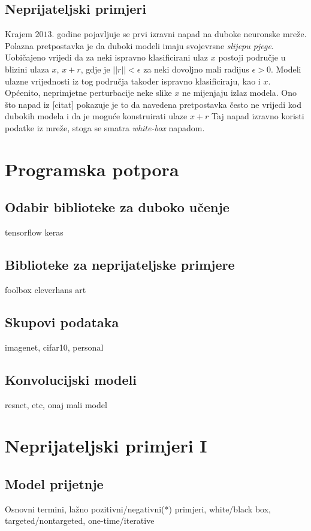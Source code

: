 \documentclass[utf8, diplomski]{fer}
\begin{document}
\section{Neprijateljski primjeri}
Krajem $2013.$ godine pojavljuje se prvi izravni napad na duboke neuronske mreže. Polazna pretpostavka je da duboki modeli imaju svojevrsne \textit{slijepu pjege}. \\
Uobičajeno vrijedi da za neki ispravno klasificirani ulaz $x$ postoji područje u blizini ulaza $x$, $x + r$, gdje je $||r|| < \epsilon$ za neki dovoljno mali radijus $\epsilon > 0$. Modeli ulazne vrijednosti iz tog područja također ispravno klasificiraju, kao i $x$. Općenito, neprimjetne perturbacije neke slike $x$ ne mijenjaju izlaz modela. Ono što napad iz [citat] pokazuje je to da navedena pretpostavka često ne vrijedi kod dubokih modela i da je moguće konstruirati ulaze $x + r$  Taj napad izravno koristi podatke iz mreže, stoga se smatra \textit{white-box} napadom. 

\chapter{Programska potpora}
\section{Odabir biblioteke za duboko učenje}
tensorflow\citep{abadi2016tensorflow} keras\citep{chollet2015keras}
\section{Biblioteke za neprijateljske primjere}
foolbox\citep{rauber2017foolbox} cleverhans\citep{papernot2018cleverhans} art\citep{art2018}
\section{Skupovi podataka}
imagenet, cifar10, personal
\section{Konvolucijski modeli}
resnet, etc, onaj mali model


\chapter{Neprijateljski primjeri I}
\section{Model prijetnje}
Osnovni termini, lažno pozitivni/negativni(*) primjeri, white/black box, targeted/nontargeted, one-time/iterative \citep{Yuan2019AdversarialEA}
\end{document}
